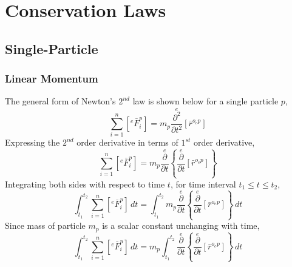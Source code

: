 \chapter{Conservation Laws}
\begin{comment}
\end{comment}
\section{Single-Particle}
\begin{comment}
\end{comment}
\subsection{Linear Momentum}
\begin{comment}
\end{comment}
The general form of Newton's $2^{nd}$ law is shown below for a single particle $p$,
$$\sum^{n}_{i = 1}\left[{}^{e}\bar{F}^{p}_{i}\right] = m_{p}\overset{e}{\frac{\partial^{2}}{\partial t^{2}}}[\bar{r}^{o_{e}p}]$$
Expressing the $2^{nd}$ order derivative in terms of $1^{st}$ order derivative,
$$\sum^{n}_{i = 1}\left[{}^{e}\bar{F}^{p}_{i}\right] = m_{p}\overset{e}{\frac{\partial}{\partial t}}\left\{\overset{e}{\frac{\partial}{\partial t}}[\bar{r}^{o_{e}p}]\right\}$$
Integrating both sides with respect to time $t$, for time interval $t_{1} \leq t \leq t_{2}$,
$$\int^{t_{2}}_{t_{1}} \sum^{n}_{i = 1}\left[{}^{e}\bar{F}^{p}_{i}\right] \,dt = \int^{t_{2}}_{t_{1}} m_{p}\overset{e}{\frac{\partial}{\partial t}}\left\{\overset{e}{\frac{\partial}{\partial t}}[\bar{r}^{o_{e}p}]\right\} \,dt$$
Since mass of particle $m_{p}$ is a scalar constant unchanging with time,
$$\int^{t_{2}}_{t_{1}} \sum^{n}_{i = 1}\left[{}^{e}\bar{F}^{p}_{i}\right] \,dt = m_{p}\int^{t_{2}}_{t_{1}} \overset{e}{\frac{\partial}{\partial t}}\left\{\overset{e}{\frac{\partial}{\partial t}}[\bar{r}^{o_{e}p}]\right\} \,dt$$

